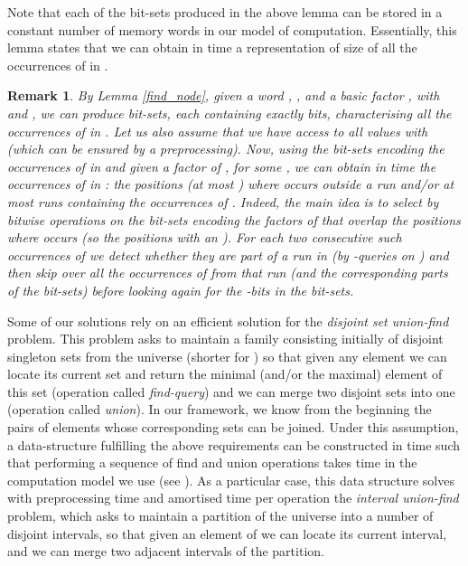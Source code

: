\documentclass[final]{dmtcs-episciences}
\newtheorem{remark}{Remark}
\begin{document}
Note that each of the bit-sets produced in the above lemma can be stored in a constant number of memory words in our model of computation. Essentially, this lemma states that we can obtain in  time a representation of size  of all the occurrences of  in . 

\begin{remark}\label{find_occ_small_range}
By Lemma \ref{find_node}, given a word , ,  and a basic factor , with  and , we can produce  bit-sets, each containing exactly  bits, characterising all the occurrences of  in . Let us also assume that we have access to all values  with  (which can be ensured by a  preprocessing). Now, using the bit-sets encoding the occurrences of  in  and given a factor  of ,  for some , we can obtain in  time the occurrences of  in : the positions (at most ) where  occurs outside a run and/or at most  runs containing the occurrences of . Indeed, the main idea is to select by bitwise operations on the bit-sets encoding the factors of  that overlap  the positions where  occurs (so the positions with an ). For each two consecutive such occurrences of  we detect whether they are part of a run in  (by -queries on ) and then skip over all the occurrences of  from that run (and the corresponding parts of the bit-sets) before looking again for the -bits in the bit-sets.
 \end{remark}

Some of our solutions rely on an efficient solution for the \emph{disjoint set union-find} problem. This problem asks to maintain a family consisting initially of  disjoint singleton sets from the universe  (shorter for ) so that given any element we can locate its current set and return the minimal (and/or the maximal) element of this set (operation called {\em find-query}) and we can merge two disjoint sets into one (operation called {\em union}). In our framework, we know from the beginning the pairs of elements whose corresponding sets can be joined. Under this assumption, a data-structure fulfilling the above requirements can be constructed in  time such that performing a sequence of  find and union operations takes  time in the computation model we use (see \cite{Gabow83}). As a particular case, this data structure solves with  preprocessing time and  amortised time per operation the \emph{interval union-find} problem, which asks to maintain a partition of the universe  into a number of  disjoint intervals, so that given an element of  we can locate its current interval, and we can merge two adjacent intervals of the partition. 
\end{document}
